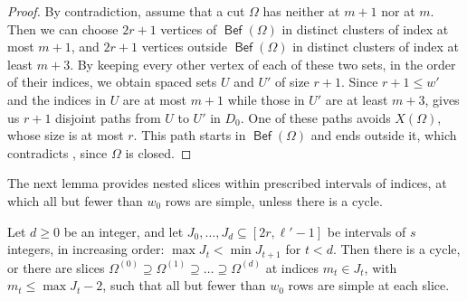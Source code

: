 \documentclass[fontsize=12pt,leading=14pt]{fullpaper}
\DeclareMathOperator{\Bef}{\mathsf{Bef}}
\begin{document}
\begin{proof}
  By contradiction, assume that a cut $\Omega$ has neither  at $m+1$ nor  at $m$.
  Then we can choose $2r+1$ vertices of $\Bef(\Omega)$ in distinct clusters of index at most $m+1$, and $2r+1$ vertices outside $\Bef(\Omega)$ in distinct clusters of index at least $m+3$.
  By keeping every other vertex of each of these two sets, in the order of their indices, we obtain spaced sets $U$ and $U'$ of size $r+1$.
  Since $r+1\le w'$ and the indices in $U$ are at most $m+1$ while those in $U'$ are at least $m+3$,  gives us $r+1$ disjoint paths from $U$ to $U'$ in $D_0$.
  One of these paths avoids $X(\Omega)$, whose size is at most $r$.
  This path starts in $\Bef(\Omega)$ and ends outside it, which contradicts , since $\Omega$ is closed.
\end{proof}

The next lemma provides nested slices within prescribed intervals of indices, at which all but fewer than $w_0$ rows are simple, unless there is a cycle.

\begin{lemma}\label{lem:slice-or-cycle}
  Let $d\ge0$ be an integer, and let $J_0,\dots,J_d\subseteq[2r,\ell'-1]$ be intervals of $s$ integers, in increasing order: $\max J_t<\min J_{t+1}$ for $t<d$.
  Then there is a cycle, or there are slices $\Omega^{(0)}\supseteq\Omega^{(1)}\supseteq\dots\supseteq\Omega^{(d)}$ at indices $m_t\in J_t$, with $m_t\le\max J_t-2$, such that all but fewer than $w_0$ rows are simple at each slice.
\end{lemma}
\end{document}
